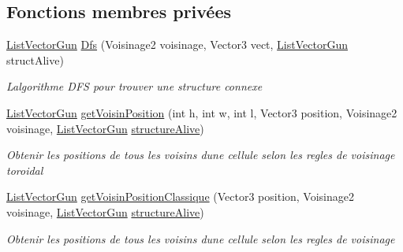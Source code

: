 \subsection*{Fonctions membres privées}
\begin{DoxyCompactItemize}
\item 
\mbox{\hyperlink{class_list_vector_gun}{List\+Vector\+Gun}} \mbox{\hyperlink{class_detection_gun_acac3e59304ebc04b56925511108ecae2}{Dfs}} (Voisinage2 voisinage, Vector3 vect, \mbox{\hyperlink{class_list_vector_gun}{List\+Vector\+Gun}} struct\+Alive)
\begin{DoxyCompactList}\small\item\em L\textquotesingle{}algorithme D\+FS pour trouver une structure connexe \end{DoxyCompactList}\item 
\mbox{\hyperlink{class_list_vector_gun}{List\+Vector\+Gun}} \mbox{\hyperlink{class_detection_gun_a6699b4b7269779a62a69bd56422128c1}{get\+Voisin\+Position}} (int h, int w, int l, Vector3 position, Voisinage2 voisinage, \mbox{\hyperlink{class_list_vector_gun}{List\+Vector\+Gun}} \mbox{\hyperlink{class_detection_gun_ae012efe697f1a4df6a18facda545e0c3}{structure\+Alive}})
\begin{DoxyCompactList}\small\item\em Obtenir les positions de tous les voisins d\textquotesingle{}une cellule selon les regles de voisinage toroidal \end{DoxyCompactList}\item 
\mbox{\hyperlink{class_list_vector_gun}{List\+Vector\+Gun}} \mbox{\hyperlink{class_detection_gun_a244439efd16406706a55f545b56a2500}{get\+Voisin\+Position\+Classique}} (Vector3 position, Voisinage2 voisinage, \mbox{\hyperlink{class_list_vector_gun}{List\+Vector\+Gun}} \mbox{\hyperlink{class_detection_gun_ae012efe697f1a4df6a18facda545e0c3}{structure\+Alive}})
\begin{DoxyCompactList}\small\item\em Obtenir les positions de tous les voisins d\textquotesingle{}une cellule selon les regles de voisinage \end{DoxyCompactList}\end{DoxyCompactItemize}
